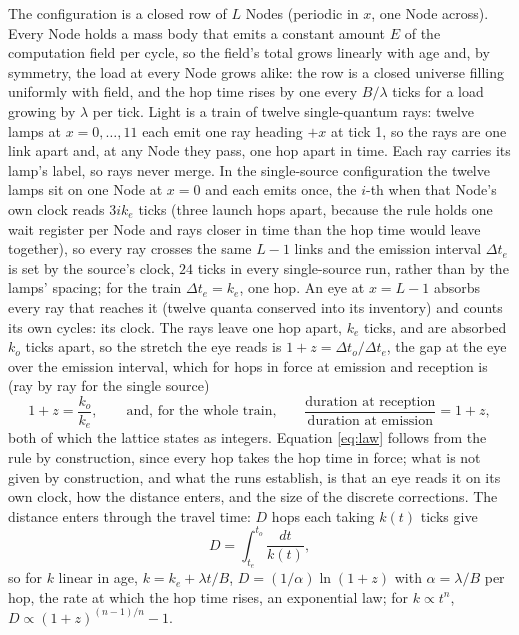 \documentclass[11pt]{article}
\begin{document}
The configuration is a closed row of $L$ Nodes (periodic in $x$, one Node
across). Every Node holds a mass body that emits a constant amount $E$ of
the computation field per cycle, so the field's total grows linearly with
age and, by symmetry, the load at every Node grows alike: the row is a
closed universe filling uniformly with field, and the hop time rises by one
every $B/\lambda$ ticks for a load growing by $\lambda$ per tick. Light is a
train of twelve single-quantum rays: twelve lamps at $x = 0, \dots, 11$ each
emit one ray heading $+x$ at tick 1, so the rays are one link apart and, at
any Node they pass, one hop apart in time. Each ray carries its lamp's label,
so rays never merge. In the single-source configuration the twelve lamps
sit on one Node at $x = 0$ and each emits once, the $i$-th when that Node's
own clock reads $3 i k_e$ ticks (three launch hops apart, because the rule
holds one wait register per Node and rays closer in time than the hop time
would leave together), so every ray crosses the same $L - 1$ links and the
emission interval $\Delta t_e$ is set by the source's clock, $24$ ticks in
every single-source run, rather than by the lamps' spacing; for the train
$\Delta t_e = k_e$, one hop. An eye at $x = L-1$ absorbs every ray that reaches it
(twelve quanta conserved into its inventory) and counts its own cycles: its
clock. The rays leave one hop apart, $k_e$ ticks, and are absorbed $k_o$
ticks apart, so the stretch the eye reads is $1 + z = \Delta t_o/\Delta
t_e$, the gap at the eye over the emission interval, which for hops in
force at emission and reception is (ray by ray for the single source)
\begin{equation}
1 + z = \frac{k_o}{k_e}, \qquad \text{and, for the whole train,}\qquad
\frac{\text{duration at reception}}{\text{duration at emission}} = 1 + z,
\label{eq:law}
\end{equation}
both of which the lattice states as integers. Equation \eqref{eq:law} follows from the rule by construction, since every hop takes the hop time in force; what is not given by construction, and what the runs establish, is that an eye reads it on its own clock, how the distance enters, and the size of the discrete corrections. The distance enters through the travel time: $D$ hops each taking $k(t)$ ticks give
\begin{equation}
D = \int_{t_e}^{t_o} \frac{dt}{k(t)},
\label{eq:distance}
\end{equation}
so for $k$ linear in age, $k = k_e + \lambda t/B$, $D = (1/\alpha)\ln(1+z)$
with $\alpha = \lambda/B$ per hop, the rate at which the hop time rises, an
exponential law; for $k \propto t^n$, $D \propto (1+z)^{(n-1)/n} - 1$.
\end{document}

